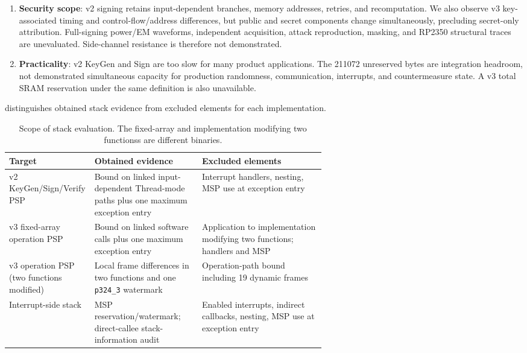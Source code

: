 \documentclass[a4paper,10pt]{article}
\theoremstyle{definition}
\theoremstyle{remark}
\begin{document}
\begin{enumerate}[leftmargin=2.2em]
  \item \textbf{Security scope}: v2 signing retains input-dependent branches, memory addresses, retries, and recomputation. We also observe v3 key-associated timing and control-flow/address differences, but public and secret components change simultaneously, precluding secret-only attribution. Full-signing power/EM waveforms, independent acquisition, attack reproduction, masking, and RP2350 structural traces are unevaluated. Side-channel resistance is therefore not demonstrated.
  \item \textbf{Practicality}: v2 KeyGen and Sign are too slow for many product applications. The \num{211072} unreserved bytes are integration headroom, not demonstrated simultaneous capacity for production randomness, communication, interrupts, and countermeasure state. A v3 total SRAM reservation under the same definition is also unavailable.
\end{enumerate}

 distinguishes obtained stack evidence from excluded elements for each implementation.

\begin{table}[H]
  \centering
  \caption{Scope of stack evaluation. The fixed-array and implementation modifying two functionss are different binaries.}
  \label{tab:stack-claim-layers}
  \footnotesize
  \begin{tabularx}{\linewidth}{@{}p{0.27\linewidth}p{0.34\linewidth}X@{}}
    \toprule
    Target & Obtained evidence & Excluded elements \\
    \midrule
    v2 KeyGen/Sign/Verify PSP & Bound on linked input-dependent Thread-mode paths plus one maximum exception entry & Interrupt handlers, nesting, MSP use at exception entry \\
    v3 fixed-array operation PSP & Bound on linked software calls plus one maximum exception entry & Application to implementation modifying two functions; handlers and MSP \\
    v3 operation PSP (two functions modified) & Local frame differences in two functions and one \texttt{p324\_3} watermark & Operation-path bound including 19 dynamic frames \\
    Interrupt-side stack & MSP reservation/watermark; direct-callee stack-information audit & Enabled interrupts, indirect callbacks, nesting, MSP use at exception entry \\
    \bottomrule
  \end{tabularx}
\end{table}
\end{document}
